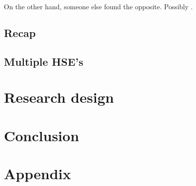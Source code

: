 \documentclass[12pt]{article}
\begin{document}
On the other hand, someone else found the opposite. Possibly \citet{Besley2014}.

\subsection{Recap \citet{Paine2019}}
\subsection{Multiple HSE's}
\section{Research design}

\section{Conclusion}

\pagebreak




\section{Appendix}
\end{document}
